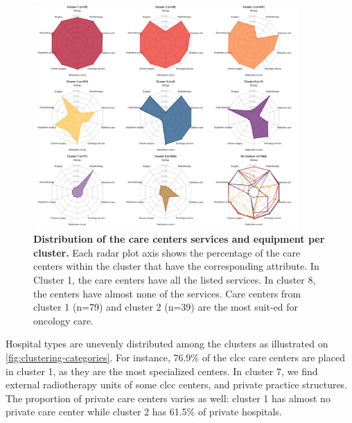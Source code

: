 \begin{figure}[H]
    \includegraphics[width=0.9\textwidth]{images/camion/fig1_clusters_services.png}
    \centering
    \caption{
        \textbf{Distribution of the care centers services and equipment per cluster.} Each radar plot axis shows the percentage of the care centers within the cluster that have the corresponding attribute. In Cluster 1, the care centers have all the listed services. In cluster 8, the centers have almost none of the services. Care centers from cluster 1 (n=79) and cluster 2 (n=39) are the most suit-ed for oncology care.
    }
    \label{fig:clustering-spider}
\end{figure}

Hospital types are unevenly distributed among the clusters as illustrated on \cref{fig:clustering-categories}. For instance, 76.9\% of the \ac{clcc} care centers are placed in cluster 1, as they are the most specialized centers. In cluster 7, we find external radiotherapy units of some \ac{clcc} centers, and private practice structures. The proportion of private care centers varies as well: cluster 1 has almost no private care center while cluster 2 has 61.5\% of private hospitals.

